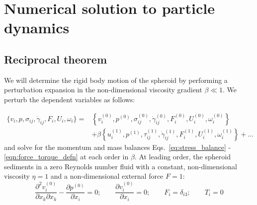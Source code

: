 \documentclass{jfm}
\begin{document}

\section{Numerical solution to particle dynamics}
\label{sec:simulation}
\subsection{Reciprocal theorem}

We will determine the rigid body motion of the spheroid by performing a perturbation expansion in the non-dimensional viscosity gradient $\beta \ll 1$.
We perturb the dependent variables as follows:

\begin{equation} \label{eq:perturbation_expansion}
\begin{split}
{\{v_i, p, \sigma_{ij},\dot{\gamma}_{ij},F_i, U_i, \omega_i \}}= &\left\{v_{i}^{(0)}, p^{(0)}, \sigma_{ij}^{(0)},\dot{\gamma}_{ij}^{(0)},F_i^{(0)},U_i^{(0)}, \omega_i^{(0)}\right\} \\
&+\beta\left\{u_{i}^{(1)}, p^{(1)}, \tau_{ij}^{(1)},\dot{\gamma}_{ij}^{(1)},F_i^{(1)},U_i^{(1)}, \omega_i^{(1)}\right\}+\ldots    
\end{split}
\end{equation}
and solve for the momentum and mass balances Eqs.~\eqref{eq:stress_balance} - \eqref{eqn:force_torque_defn} at each order in $\beta$. At leading order, the spheroid sediments in a zero Reynolds number fluid with a constant, non-dimensional viscosity $\eta =1$ and a non-dimensional external force $F = 1$:
\begin{equation}
\label{eq:stokes_leading_order}
    \frac{\partial ^2 v_i^{(0)}}{\partial x_k \partial x_k}-\frac{\partial p^{(0)}}{\partial x_i} =0 ; \qquad \frac{\partial v_i^{(0)}}{\partial x_i} =0 ;\qquad F_i =\delta_{i3} ;\qquad T_i =0
\end{equation}
\end{document}
